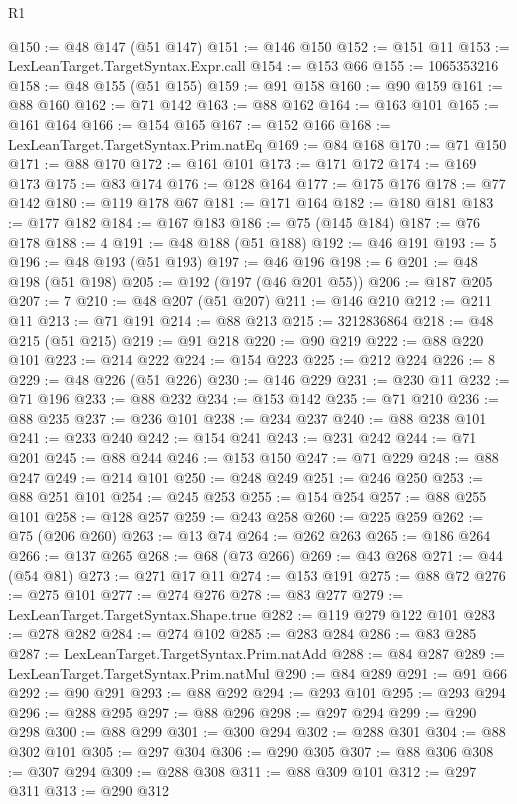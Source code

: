 \begin{lexlean}{R1}
\begin{coremodule}
@150 := @48 @147 (@51 @147)
@151 := @146 @150
@152 := @151 @11
@153 := LexLeanTarget.TargetSyntax.Expr.call
@154 := @153 @66
@155 := 1065353216
@158 := @48 @155 (@51 @155)
@159 := @91 @158
@160 := @90 @159
@161 := @88 @160
@162 := @71 @142
@163 := @88 @162
@164 := @163 @101
@165 := @161 @164
@166 := @154 @165
@167 := @152 @166
@168 := LexLeanTarget.TargetSyntax.Prim.natEq
@169 := @84 @168
@170 := @71 @150
@171 := @88 @170
@172 := @161 @101
@173 := @171 @172
@174 := @169 @173
@175 := @83 @174
@176 := @128 @164
@177 := @175 @176
@178 := @77 @142
@180 := @119 @178 @67
@181 := @171 @164
@182 := @180 @181
@183 := @177 @182
@184 := @167 @183
@186 := @75 (@145 @184)
@187 := @76 @178
@188 := 4
@191 := @48 @188 (@51 @188)
@192 := @46 @191
@193 := 5
@196 := @48 @193 (@51 @193)
@197 := @46 @196
@198 := 6
@201 := @48 @198 (@51 @198)
@205 := @192 (@197 (@46 @201 @55))
@206 := @187 @205
@207 := 7
@210 := @48 @207 (@51 @207)
@211 := @146 @210
@212 := @211 @11
@213 := @71 @191
@214 := @88 @213
@215 := 3212836864
@218 := @48 @215 (@51 @215)
@219 := @91 @218
@220 := @90 @219
@222 := @88 @220 @101
@223 := @214 @222
@224 := @154 @223
@225 := @212 @224
@226 := 8
@229 := @48 @226 (@51 @226)
@230 := @146 @229
@231 := @230 @11
@232 := @71 @196
@233 := @88 @232
@234 := @153 @142
@235 := @71 @210
@236 := @88 @235
@237 := @236 @101
@238 := @234 @237
@240 := @88 @238 @101
@241 := @233 @240
@242 := @154 @241
@243 := @231 @242
@244 := @71 @201
@245 := @88 @244
@246 := @153 @150
@247 := @71 @229
@248 := @88 @247
@249 := @214 @101
@250 := @248 @249
@251 := @246 @250
@253 := @88 @251 @101
@254 := @245 @253
@255 := @154 @254
@257 := @88 @255 @101
@258 := @128 @257
@259 := @243 @258
@260 := @225 @259
@262 := @75 (@206 @260)
@263 := @13 @74
@264 := @262 @263
@265 := @186 @264
@266 := @137 @265
@268 := @68 (@73 @266)
@269 := @43 @268
@271 := @44 (@54 @81)
@273 := @271 @17 @11
@274 := @153 @191
@275 := @88 @72
@276 := @275 @101
@277 := @274 @276
@278 := @83 @277
@279 := LexLeanTarget.TargetSyntax.Shape.true
@282 := @119 @279 @122 @101
@283 := @278 @282
@284 := @274 @102
@285 := @283 @284
@286 := @83 @285
@287 := LexLeanTarget.TargetSyntax.Prim.natAdd
@288 := @84 @287
@289 := LexLeanTarget.TargetSyntax.Prim.natMul
@290 := @84 @289
@291 := @91 @66
@292 := @90 @291
@293 := @88 @292
@294 := @293 @101
@295 := @293 @294
@296 := @288 @295
@297 := @88 @296
@298 := @297 @294
@299 := @290 @298
@300 := @88 @299
@301 := @300 @294
@302 := @288 @301
@304 := @88 @302 @101
@305 := @297 @304
@306 := @290 @305
@307 := @88 @306
@308 := @307 @294
@309 := @288 @308
@311 := @88 @309 @101
@312 := @297 @311
@313 := @290 @312

\end{coremodule}
\end{lexlean}

